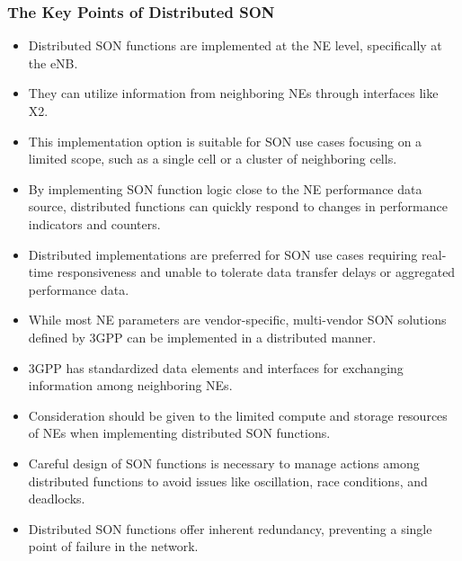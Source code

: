 \subsubsection{The Key Points of Distributed SON}
\begin{itemize}

\item Distributed SON functions are implemented at the NE level, specifically at the eNB.

\item They can utilize information from neighboring NEs through interfaces like X2.

\item This implementation option is suitable for SON use cases focusing on a limited scope, such as a single cell or a cluster of neighboring cells.

\item By implementing SON function logic close to the NE performance data source, distributed functions can quickly respond to changes in performance indicators and counters.

\item Distributed implementations are preferred for SON use cases requiring real-time responsiveness and unable to tolerate data transfer delays or aggregated performance data.

\item While most NE parameters are vendor-specific, multi-vendor SON solutions defined by 3GPP can be implemented in a distributed manner.

\item 3GPP has standardized data elements and interfaces for exchanging information among neighboring NEs.

\item Consideration should be given to the limited compute and storage resources of NEs when implementing distributed SON functions.

\item Careful design of SON functions is necessary to manage actions among distributed functions to avoid issues like oscillation, race conditions, and deadlocks.

\item Distributed SON functions offer inherent redundancy, preventing a single point of failure in the network.


\end{itemize}


